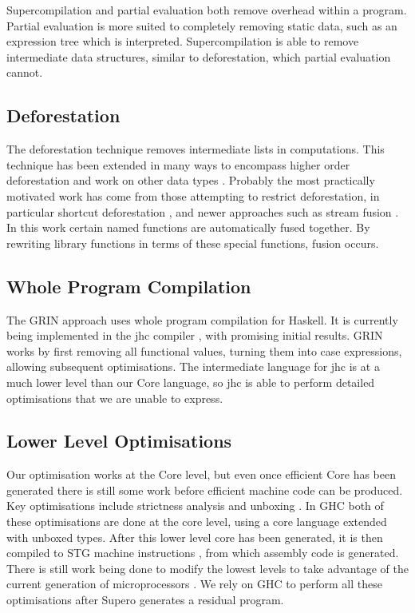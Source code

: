 Supercompilation and partial evaluation both remove overhead within a program. Partial evaluation is more suited to completely removing static data, such as an expression tree which is interpreted. Supercompilation is able to remove intermediate data structures, similar to deforestation, which partial evaluation cannot.


\subsection{Deforestation}

The deforestation technique \cite{wadler:deforestation} removes intermediate lists in computations. This technique has been extended in many ways to encompass higher order deforestation \cite{marlow:higher_order_deforestation} and work on other data types \cite{coutts:string_fusion}. Probably the most practically motivated work has come from those attempting to restrict deforestation, in particular shortcut deforestation \cite{gill:shortcut_deforestation}, and newer approaches such as stream fusion \cite{coutts:stream_fusion}. In this work certain named functions are automatically fused together. By rewriting library functions in terms of these special functions, fusion occurs.

\subsection{Whole Program Compilation}

The GRIN approach \cite{grin} uses whole program compilation for Haskell. It is currently being implemented in the jhc compiler \cite{jhc}, with promising initial results. GRIN works by first removing all functional values, turning them into case expressions, allowing subsequent optimisations. The intermediate language for jhc is at a much lower level than our Core language, so jhc is able to perform detailed optimisations that we are unable to express.

\subsection{Lower Level Optimisations}

Our optimisation works at the Core level, but even once efficient Core has been generated there is still some work before efficient machine code can be produced. Key optimisations include strictness analysis and unboxing \cite{spj:unboxing}. In GHC both of these optimisations are done at the core level, using a core language extended with unboxed types. After this lower level core has been generated, it is then compiled to STG machine instructions \cite{spj:stg}, from which assembly code is generated. There is still work being done to modify the lowest levels to take advantage of the current generation of microprocessors \cite{marlow:pointer_tagging}. We rely on GHC to perform all these optimisations after Supero generates a residual program.

